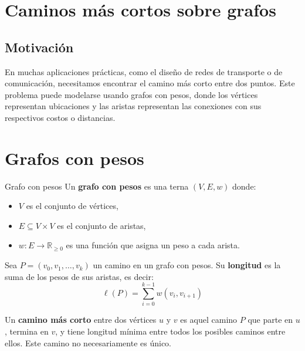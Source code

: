 
\section{Caminos más cortos sobre grafos}

\subsection{Motivación}
En muchas aplicaciones prácticas, como el diseño de redes de transporte o de comunicación, necesitamos encontrar el camino más corto entre dos puntos. Este problema puede modelarse usando grafos con pesos, donde los vértices representan ubicaciones y las aristas representan las conexiones con sus respectivos costos o distancias.

\section{Grafos con pesos}
\begin{definitionblock}{Grafo con pesos}
Un \textbf{grafo con pesos} es una terna $(V, E, w)$ donde:
\begin{itemize}
  \item $V$ es el conjunto de vértices,
  \item $E \subseteq V \times V$ es el conjunto de aristas,
  \item $w: E \rightarrow \mathbb{R}_{\geq 0}$ es una función que asigna un peso a cada arista.
\end{itemize}
\end{definitionblock}

Sea $P = (v_0, v_1, \dots, v_k)$ un camino en un grafo con pesos. Su \textbf{longitud} es la suma de los pesos de sus aristas, es decir:
\[
\ell(P) = \sum_{i=0}^{k-1} w(v_i, v_{i+1})
\]

Un \textbf{camino más corto} entre dos vértices $u$ y $v$ es aquel camino $P$ que parte en $u$, termina en $v$, y tiene longitud mínima entre todos los posibles caminos entre ellos. Este camino no necesariamente es único.




